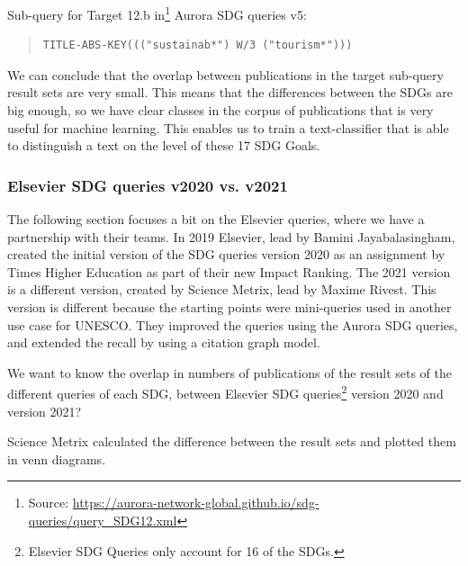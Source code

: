 \documentclass{article}
\begin{document}
Sub-query for Target 12.b in\footnote{ Source: \url{https://aurora-network-global.github.io/sdg-queries/query_SDG12.xml}} Aurora SDG queries v5:
\begin{quote}
\begin{verbatim}
TITLE-ABS-KEY((("sustainab*") W/3 ("tourism*")))
\end{verbatim}
\end{quote}

We can conclude that the overlap between publications in the target sub-query result sets are very small. This means that the differences between the SDGs are big enough, so we have clear classes in the corpus of publications that is very useful for machine learning. This enables us to train a text-classifier that is able to distinguish a text on the level of these 17 SDG Goals.


\subsubsection{Elsevier SDG queries v2020 vs. v2021}
The following section focuses a bit on the Elsevier queries, where we have a partnership with their teams. In 2019 Elsevier, lead by Bamini Jayabalasingham, created the initial version of the SDG queries version 2020 as an assignment by Times Higher Education as part of their new Impact Ranking. \cite{jayabalasingham_identifying_2019}
The 2021 version is a different version, created by Science Metrix, lead by Maxime Rivest. \cite{rivest_improving_2021} This version is different because the starting points were mini-queries used in another use case for UNESCO. They improved the queries using the Aurora SDG queries, and extended the recall by using a citation graph model.

We want to know the overlap in numbers of publications of the result sets of the different queries of each SDG, between Elsevier SDG queries\footnote{Elsevier SDG Queries only account for 16 of the SDGs.} version 2020 and version 2021?

Science Metrix calculated the difference between the result sets and plotted them in venn diagrams.
\end{document}

